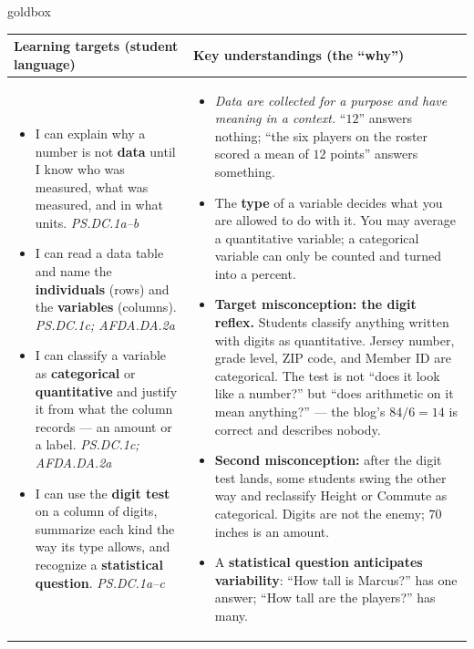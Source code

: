 \documentclass[10pt]{article}
\begin{document}
\renewcommand{\arraystretch}{1.4}
\boxguard
\begin{skillbox}{goldbox}
\begin{tabularx}{\linewidth}{@{}X|X@{}}
\textbf{Learning targets (student language)} & \textbf{Key understandings (the ``why'')} \\[2pt]
\hline
\vspace{-6pt}
\begin{itemize}[leftmargin=1.1em, nosep, after=\vspace{2pt}]
  \item I can explain why a number is not \textbf{data} until I know who was measured, what
        was measured, and in what units. \hfill \textit{PS.DC.1a--b}
  \item I can read a data table and name the \textbf{individuals} (rows) and the
        \textbf{variables} (columns). \hfill \textit{PS.DC.1c; AFDA.DA.2a}
  \item I can classify a variable as \textbf{categorical} or \textbf{quantitative} and
        justify it from what the column records --- an amount or a label.
        \hfill \textit{PS.DC.1c; AFDA.DA.2a}
  \item I can use the \textbf{digit test} on a column of digits, summarize each kind the way
        its type allows, and recognize a \textbf{statistical question}.
        \hfill \textit{PS.DC.1a--c}
\end{itemize}
&
\vspace{-6pt}
\begin{itemize}[leftmargin=1.1em, nosep, after=\vspace{2pt}]
  \item \emph{Data are collected for a purpose and have meaning in a context.} ``$12$''
        answers nothing; ``the six players on the roster scored a mean of $12$ points''
        answers something.
  \item The \textbf{type} of a variable decides what you are allowed to do with it. You may
        average a quantitative variable; a categorical variable can only be counted and turned
        into a percent.
  \item \textbf{Target misconception: the digit reflex.} Students classify anything written
        with digits as quantitative. Jersey number, grade level, ZIP code, and Member ID are
        categorical. The test is not ``does it look like a number?'' but ``does arithmetic on
        it mean anything?'' --- the blog's $84/6 = 14$ is correct and describes nobody.
  \item \textbf{Second misconception:} after the digit test lands, some students swing the
        other way and reclassify Height or Commute as categorical. Digits are not the enemy;
        $70$ inches is an amount.
  \item A \textbf{statistical question anticipates variability}: ``How tall is Marcus?'' has
        one answer; ``How tall are the players?'' has many.
\end{itemize}
\end{tabularx}
\end{skillbox}
\end{document}
